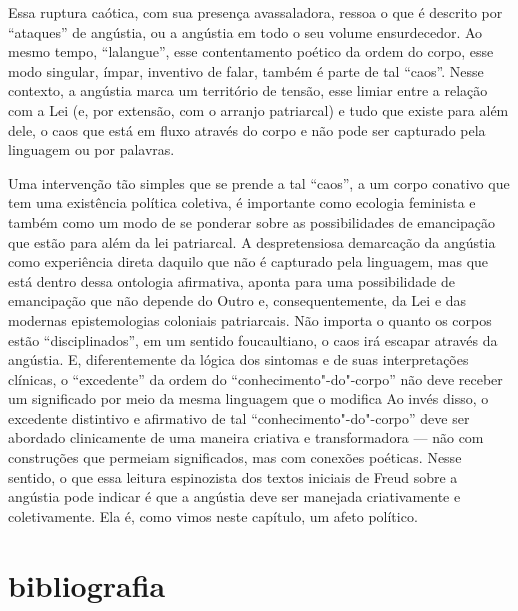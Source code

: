 Essa ruptura caótica, com sua presença avassaladora, ressoa o que é
descrito por ``ataques'' de angústia, ou a angústia em todo o seu volume
ensurdecedor. Ao mesmo tempo, ``lalangue'', esse contentamento poético
da ordem do corpo, esse modo singular, ímpar, inventivo de falar, também
é parte de tal ``caos''. Nesse contexto, a angústia marca um território
de tensão, esse limiar entre a relação com a Lei (e, por extensão, com o
arranjo patriarcal) e tudo que existe para além dele, o caos que está em
fluxo através do corpo e não pode ser capturado pela linguagem ou por
palavras.

Uma intervenção tão simples que se prende a tal ``caos'', a um corpo
conativo que tem uma existência política coletiva, é importante como
ecologia feminista e também como um modo de se ponderar sobre as
possibilidades de emancipação que estão para além da lei patriarcal. A
despretensiosa demarcação da angústia como experiência direta daquilo
que não é capturado pela linguagem, mas que está dentro dessa ontologia
afirmativa, aponta para uma possibilidade de emancipação que não depende
do Outro e, consequentemente, da Lei e das modernas epistemologias
coloniais patriarcais. Não importa o quanto os corpos estão
``disciplinados'', em um sentido foucaultiano, o caos irá escapar
através da angústia. E, diferentemente da lógica dos sintomas e de suas
interpretações clínicas, o ``excedente'' da ordem do
``conhecimento"-do"-corpo'' não deve receber um significado por meio da
mesma linguagem que o modifica Ao invés disso, o excedente distintivo e
afirmativo de tal ``conhecimento"-do"-corpo'' deve ser abordado
clinicamente de uma maneira criativa e transformadora --- não com
construções que permeiam significados, mas com conexões poéticas. Nesse
sentido, o que essa leitura espinozista dos textos iniciais de Freud
sobre a angústia pode indicar é que a angústia deve ser manejada
criativamente e coletivamente. Ela é, como vimos neste capítulo, um
afeto político.

\section{bibliografia}

